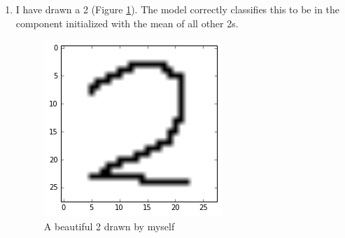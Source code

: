 \documentclass[a4paper]{article}
\begin{document}
\begin{enumerate}
\item I have drawn a 2 (Figure \ref{fig:mydigit}). The model correctly classifies this to be in the component initialized with the mean of all other 2s.

\begin{figure}
\centering
\includegraphics[width=.3\linewidth]{figures/mydigit.png}
\caption{A beautiful 2 drawn by myself}
\label{fig:mydigit}
\end{figure}
\end{enumerate}
\end{document}
